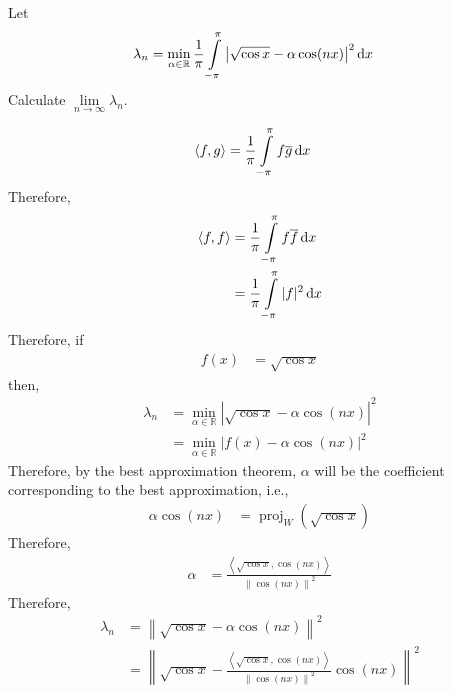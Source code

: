 \documentclass[fleqn, 8pt]{amsart}
\theoremstyle{definition}
\theoremstyle{theorem}
\DeclareMathOperator{\proj}{proj}
\begin{document}
\begin{multicols}{2}
\begin{spacing}{0.7}
\begin{question}
	Let
	\begin{align*}
		\lambda_n & = \min\limits_{\alpha \in \mathbb{R}} \frac{1}{\pi} \int\limits_{-\pi}^{\pi} \left| \sqrt{\cos x} - \alpha \cos(n x) \right|^2 \dif x
	\end{align*}
	Calculate $\lim\limits_{n \to \infty} \lambda_n$.
\end{question}

\begin{solution}
	\begin{align*}
		\langle f,g \rangle & = \frac{1}{\pi} \int\limits_{-\pi}^{\pi} f \overline{g} \dif x
	\end{align*}
	Therefore,
	\begin{align*}
		\langle f,f \rangle & = \frac{1}{\pi} \int\limits_{-\pi}^{\pi} f \overline{f} \dif x \\
                                    & = \frac{1}{\pi} \int\limits_{-\pi}^{\pi} |f|^2 \dif x
	\end{align*}
	Therefore, if
	\begin{align*}
		f(x) & = \sqrt{\cos x}
	\end{align*}
	then,
	\begin{align*}
		\lambda_n & = \min\limits_{\alpha \in \mathbb{R}} \left| \sqrt{\cos x} - \alpha \cos(n x) \right|^2 \\
                          & = \min\limits_{\alpha \in \mathbb{R}} \left| f(x) - \alpha \cos(n x) \right|^2
	\end{align*}
	Therefore, by the best approximation theorem, $\alpha$ will be the coefficient corresponding to the best approximation, i.e.,
	\begin{align*}
		\alpha \cos(n x) & = \proj_{W}\left( \sqrt{\cos x} \right)
	\end{align*}
	Therefore,
	\begin{align*}
		\alpha & = \frac{\left\langle \sqrt{\cos x},\cos(n x) \right\rangle}{\left\| \cos(n x) \right\|^2}
	\end{align*}
	Therefore,
	\begin{align*}
		\lambda_n & = \left\| \sqrt{\cos x} - \alpha \cos(n x) \right\|^2                                                                                                       \\
                          & = \left\| \sqrt{\cos x} - \frac{\left\langle \sqrt{\cos x},\cos(n x) \right\rangle}{\left\| \cos(n x) \right\|^2} \cos(n x) \right\|^2                      \\

\end{align*}
\end{solution}
\end{spacing}
\end{multicols}
\end{document}
